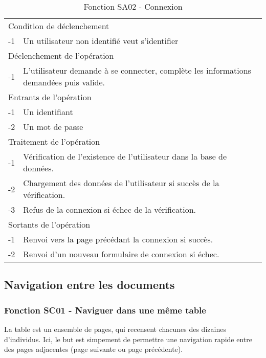 \documentclass[a4paper]{article}
\begin{document}
\begin{table}[H]
  \centering
   \small
	\begin{tabular}{|c|p{12cm}|}
   		\hline
   			\rowcolor{lightgray}\multicolumn{2}{|c|}{\textbf{Fonction SA02 - Connexion}} \\
   		\hline
   			\multicolumn{2}{|l|}{Condition de déclenchement} \\
   		\hline
   			-1 & Un utilisateur non identifié veut s'identifier\\
   		\hline
   			\multicolumn{2}{|l|}{Déclenchement de l'opération} \\
   		\hline
   			-1 & L'utilisateur demande à se connecter, complète les informations demandées puis valide.\\
   		\hline
   			\multicolumn{2}{|l|}{Entrants de l'opération} \\
   		\hline
   			-1 & Un identifiant\\
        	-2 & Un mot de passe\\
   		\hline
   			\multicolumn{2}{|l|}{Traitement de l'opération} \\
  		\hline
   			-1 & Vérification de l’existence de l'utilisateur dans la base de données.\\
        	-2 & Chargement des données de l'utilisateur si succès de la vérification.\\
        	-3 & Refus de la connexion si échec de la vérification.\\
   		\hline
   			\multicolumn{2}{|l|}{Sortants de l'opération} \\
   		\hline
   			-1 & Renvoi vers la page précédant la connexion si succès.\\
            -2 & Renvoi d'un nouveau formulaire de connexion si échec.\\
   		\hline
	\end{tabular}
  \caption{Fonction SA02 - Connexion}
  \normalsize
  \label{tab: connexion}
\end{table}


\subsection{Navigation entre les documents}

\subsubsection{Fonction SC01 - Naviguer dans une m\^eme table}

La table est un ensemble de pages, qui recensent chacunes des dizaines d'individus. Ici, le but est simpement de permettre une navigation rapide entre des pages adjacentes (page suivante ou page pr\'ec\'edente).
\end{document}

